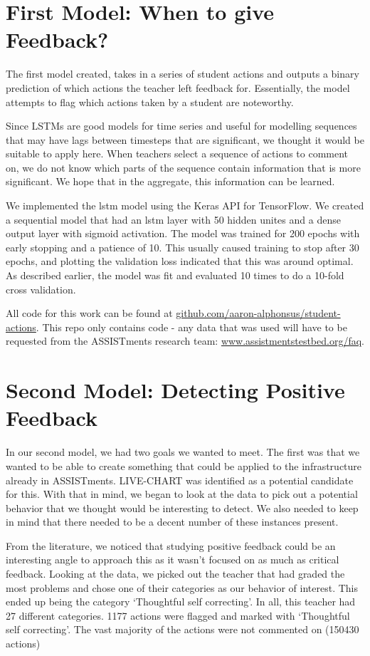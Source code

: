 \documentclass[12pt]{report}
\begin{document}
\section{First Model: When to give Feedback?}
The first model created, takes in a series of student actions and outputs a binary prediction of which actions the teacher left feedback for. Essentially, the model attempts to flag which actions taken by a student are noteworthy. 

Since LSTMs are good models for time series and useful for modelling sequences that may have lags between timesteps that are significant, we thought it would be suitable to apply here. When teachers select a sequence of actions to comment on, we do not know which parts of the sequence contain information that is more significant. We hope that in the aggregate, this information can be learned. 

We implemented the lstm model using the Keras API for TensorFlow. We created a sequential model that had an lstm layer with 50 hidden unites and a dense output layer with sigmoid activation. The model was trained for 200 epochs with early stopping and a patience of 10. This usually caused training to stop after 30 epochs, and plotting the validation loss indicated that this was around optimal. As described earlier, the model was fit and evaluated 10 times to do a 10-fold cross validation.

All code for this work can be found at \href{https://github.com/aaron-alphonsus/student-actions}{github.com/aaron-alphonsus/student-actions}. This repo only contains code - any data that was used will have to be requested from the ASSISTments research team: \href{http://www.assistmentstestbed.org/faq}{www.assistmentstestbed.org/faq}.

\section{Second Model: Detecting Positive Feedback}
In our second model, we had two goals we wanted to meet. The first was that we wanted to be able to create something that could be applied to the infrastructure already in ASSISTments. LIVE-CHART was identified as a potential candidate for this. With that in mind, we began to look at the data to pick out a potential behavior that we thought would be interesting to detect. We also needed to keep in mind that there needed to be a decent number of these instances present. 

From the literature, we noticed that studying positive feedback could be an interesting angle to approach this as it wasn't focused on as much as critical feedback. Looking at the data, we picked out the teacher that had graded the most problems and chose one of their categories as our behavior of interest. This ended up being the category `Thoughtful self correcting'. In all, this teacher had 27 different categories. 1177 actions were flagged and marked with `Thoughtful self correcting'. The vast majority of the actions were not commented on (150430 actions)
\end{document}
